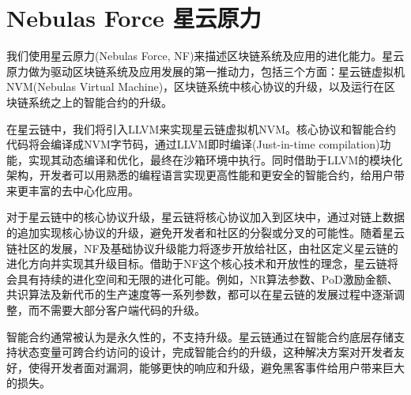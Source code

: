 \section{Nebulas Force 星云原力}
\label{sec:nebulasforce}

我们使用星云原力(Nebulas Force, NF)来描述区块链系统及应用的进化能力。星云原力做为驱动区块链系统及应用发展的第一推动力，包括三个方面：星云链虚拟机NVM(Nebulas Virtual Machine)，区块链系统中核心协议的升级，以及运行在区块链系统之上的智能合约的升级。

在星云链中，我们将引入LLVM来实现星云链虚拟机NVM。核心协议和智能合约代码将会编译成NVM字节码，通过LLVM即时编译(Just-in-time compilation)功能，实现其动态编译和优化，最终在沙箱环境中执行。同时借助于LLVM的模块化架构，开发者可以用熟悉的编程语言实现更高性能和更安全的智能合约，给用户带来更丰富的去中心化应用。

对于星云链中的核心协议升级，星云链将核心协议加入到区块中，通过对链上数据的追加实现核心协议的升级，避免开发者和社区的分裂或分叉的可能性。随着星云链社区的发展，NF及基础协议升级能力将逐步开放给社区，由社区定义星云链的进化方向并实现其升级目标。借助于NF这个核心技术和开放性的理念，星云链将会具有持续的进化空间和无限的进化可能。例如，NR算法参数、PoD激励金额、共识算法及新代币的生产速度等一系列参数，都可以在星云链的发展过程中逐渐调整，而不需要大部分客户端代码的升级。

智能合约通常被认为是永久性的，不支持升级。星云链通过在智能合约底层存储支持状态变量可跨合约访问的设计，完成智能合约的升级，这种解决方案对开发者友好，使得开发者面对漏洞，能够更快的响应和升级，避免黑客事件给用户带来巨大的损失。




